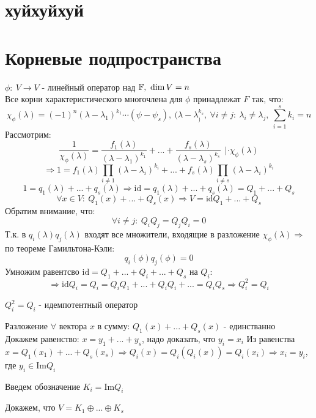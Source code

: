 \section{хуйхуйхуй}
\section{Корневые подпространства}
    $\phi:\ V \to V$ - линейный оператор над $\mathbb F, \ \dim V = n$\\
    Все корни характеристического многочлена для $\phi$ принадлежат $F$ так, что:
    $$\chi_\phi(\lambda) = (-1)^n(\lambda-\lambda_1)^{k_1} \cdots (\psi - \psi_s), \ (\lambda-\lambda_)^{k_s}, \ \forall i \neq j: \  \lambda_i \neq \lambda_j, \ \sum \limits_{i=1}^sk_i = n$$
    Рассмотрим: 
    $$\frac{1}{\chi_\phi(\lambda)} = \frac{f_1(\lambda)}{(\lambda-\lambda_1)^{k_1}} + ... + \frac{f_s(\lambda)}{(\lambda-\lambda_s)^{k_s}} \ \ | \cdot \chi_\phi(\lambda)$$ $$\Longrightarrow 1 = f_1 (\lambda) \prod\limits_{i\neq 1}(\lambda-\lambda_i)^{k_i} + ... + f_s (\lambda) \prod\limits_{i\neq s}(\lambda-\lambda_i)^{k_i}$$
    $$1= q_1(\lambda) + ... + q_s(\lambda) \Longrightarrow  \text{id} = q_1(\lambda) + ... + q_s(\lambda) = Q_1 + ... + Q_s$$
    $$\forall x \in V: \ Q_1(x) + ... + Q_s(x) \Longrightarrow V = \text{id} Q_1 + ... + Q_s$$
    Обратим внимание, что:
    $$\forall i \neq j: \ Q_iQ_j = Q_jQ_i = 0$$
    Т.к. в $q_i(\lambda)q_j(\lambda)$ входят все множители, входящие в разложение $\chi_\phi(\lambda) \Longrightarrow $ по теореме Гамильтона-Кэли: 
    $$q_i(\phi)q_j(\phi) = 0$$
    Умножим равентсво $\text{id} = Q_1+...+Q_i+...+Q_s$ на $Q_i:$ $$\Longrightarrow \text{id}Q_i = Q_i = Q_iQ_1+...+Q_iQ_i+...=Q_iQ_s \Longrightarrow Q_i^2 = Q_i$$
    \begin{definition}
        $Q_i^2 = Q_i$ - идемпотентный оператор
    \end{definition}  
    Разложение $\forall$ вектора $x$ в сумму: $Q_1(x) + ... + Q_s(x)$ - единстванно\\
    Докажем равенство: $x = y_1+ ... + y_s$, надо доказать, что $y_i = x_i$
    Из равенства $x = Q_1(x_1) + ... + Q_s(x_s) \Longrightarrow Q_i(x) = Q_i(Q_i(x)) = Q_i(x_i) \Longrightarrow x_i = y_i$, где $y_i \in \text{Im}Q_i$
    
    Введем обозначение $K_i = \text{Im}Q_i$
    
    Докажем, что $V = K_1 \oplus ... \oplus K_s$
    
